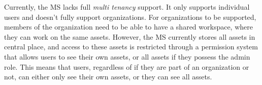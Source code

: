 

Currently, the MS lacks full \textit{multi tenancy} support.
It only supports individual users and doesn't fully support organizations.
For organizations to be supported, members of the organization need to be able to have a
shared workspace, where they can work on the same assets.
However, the MS currently stores all assets in central place,
and access to these assets is restricted through a permission system that allows users to see
their own assets, or all assets if they possess the admin role.
This means that users, regardless of if they are part of an organization or not,
can either only see their own assets,  or they can see all assets.




